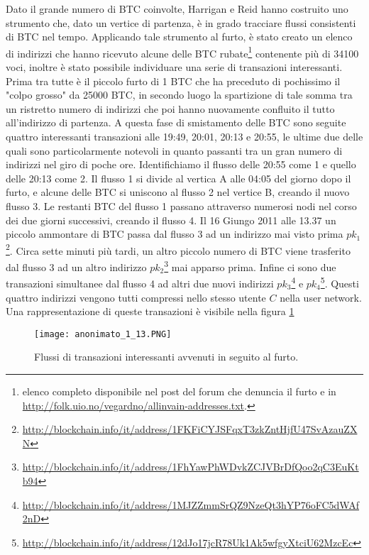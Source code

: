 Dato il grande numero di BTC coinvolte, Harrigan e Reid hanno costruito uno strumento che, dato un vertice di partenza, è in grado tracciare flussi consistenti di BTC nel tempo.
Applicando tale strumento al furto, è stato creato un elenco di indirizzi che hanno ricevuto alcune delle BTC rubate\footnote{elenco completo disponibile nel post del forum che denuncia il furto e in \url{http://folk.uio.no/vegardno/allinvain-addresses.txt}.} contenente più di 34100 voci, inoltre è stato possibile individuare una serie di transazioni interessanti.
Prima tra tutte è il piccolo furto di 1 BTC che ha preceduto di pochissimo il "colpo grosso" da 25000 BTC, in secondo luogo la spartizione di tale somma tra un ristretto numero di indirizzi che poi hanno nuovamente confluito il tutto all'indirizzo di partenza.
A questa fase di smistamento delle BTC sono seguite quattro interessanti transazioni alle 19:49, 20:01, 20:13 e 20:55, le ultime due delle quali sono particolarmente notevoli in quanto passanti tra un gran numero di indirizzi nel giro di poche ore.
Identifichiamo il flusso delle 20:55 come 1 e quello delle 20:13 come 2. Il flusso 1 si divide al vertica A alle 04:05 del giorno dopo il furto, e alcune delle BTC si uniscono al flusso 2 nel vertice B, creando il nuovo flusso 3. Le restanti BTC del flusso 1 passano attraverso numerosi nodi nel corso dei due giorni successivi, creando il flusso 4.
Il 16 Giungo 2011 alle 13.37 un piccolo ammontare di BTC passa dal flusso 3 ad un indirizzo mai visto prima $pk_1$\footnote{\url{http://blockchain.info/it/address/1FKFiCYJSFqxT3zkZntHjfU47SvAzauZXN}}. Circa sette minuti più tardi, un altro piccolo numero di BTC viene trasferito dal flusso 3 ad un altro indirizzo $pk_2$\footnote{\url{http://blockchain.info/it/address/1FhYawPhWDvkZCJVBrDfQoo2qC3EuKtb94}} mai apparso prima. Infine ci sono due transazioni simultanee dal flusso 4 ad altri due nuovi indirizzi $pk_3$\footnote{\url{http://blockchain.info/it/address/1MJZZmmSrQZ9NzeQt3hYP76oFC5dWAf2nD}} e $pk_4$\footnote{\url{http://blockchain.info/it/address/12dJo17jcR78Uk1Ak5wfgyXtciU62MzcEc}}. Questi quattro indirizzi vengono tutti compressi nello stesso utente $C$ nella user network. Una rappresentazione di queste transazioni è visibile nella figura \ref{anonimato_1_13}

\begin{figure}[htbp]
\centering
\texttt{[image: anonimato\_1\_13.PNG]}
\caption{Flussi di transazioni interessanti avvenuti in seguito al furto.\label{anonimato_1_13}}
\end{figure}

